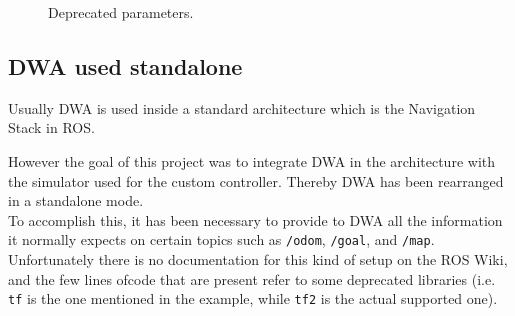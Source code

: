 \documentclass[11pt,a4paper]{article}
\begin{document}
\begin{figure}[H]
    \centering
    \quad
    \caption[]{Deprecated parameters.}
\end{figure}



\subsection{DWA used standalone}

Usually DWA is used inside a standard architecture which is the Navigation Stack in ROS.

However the goal of this project was to integrate DWA in the architecture with the simulator used for
the custom controller. Thereby DWA has been rearranged in a standalone mode.\\

To accomplish this, it has been necessary to provide to DWA all the information it normally expects on
certain topics such as \texttt{/odom}, \texttt{/goal}, and \texttt{/map}.\\

Unfortunately there is no documentation for this kind of setup on the ROS Wiki, and the few lines ofcode
that are present refer to some deprecated libraries (i.e. \texttt{tf} is the one mentioned in the example,
while \texttt{tf2} is the actual supported one).
\end{document}
